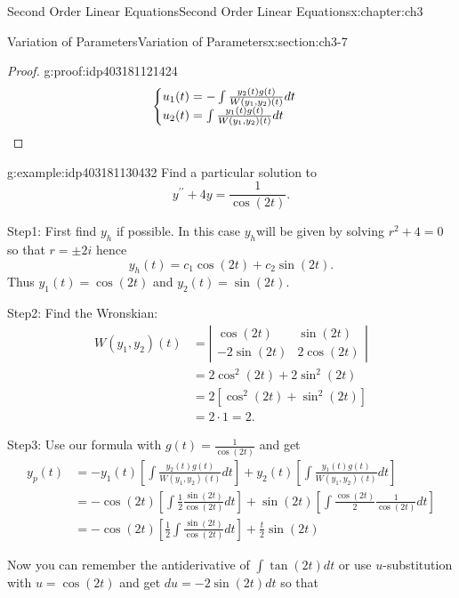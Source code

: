 \documentclass[oneside,10pt,]{book}
\newcommand{\qedhere}{\relax}
\numberwithin{equation}{section}
\numberwithin{equation}{section}
\newcommand{\amp}{&}
\begin{document}
\begin{chapterptx}{Second Order Linear Equations}{}{Second Order Linear Equations}{}{}{x:chapter:ch3}
\begin{sectionptx}{Variation of Parameters}{}{Variation of Parameters}{}{}{x:section:ch3-7}
\begin{proof}{}{g:proof:idp403181121424}
\begin{equation*}
\begin{cases}
u_{1}(t)=-\int\frac{y_{2}(t)g(t)}{W\left(y_{1},y_{2}\right)(t)}dt\\
u_{2}(t)=\int\frac{y_{1}(t)g(t)}{W\left(y_{1},y_{2}\right)(t)}dt
\end{cases}\qedhere
\end{equation*}
%
\end{proof}
\begin{example}{}{g:example:idp403181130432}%
Find a particular solution to%
\begin{equation*}
y^{\prime\prime}+4y=\frac{1}{\cos\left(2t\right)}.
\end{equation*}
%
\par
Step1: First find \(y_{h}\) if possible. In this case \(y_{h}\)will be given by solving \(r^{2}+4=0\) so that \(r=\pm2i\) hence%
\begin{equation*}
y_{h}(t)=c_{1}\cos(2t)+c_{2}\sin\left(2t\right).
\end{equation*}
Thus \(y_{1}(t)=\cos(2t)\) and \(y_{2}(t)=\sin\left(2t\right)\).%
\par
Step2: Find the Wronskian:%
\begin{align*}
W(y_{1},y_{2})(t) \amp =\left|\begin{array}{cc}
\cos(2t) \amp \sin\left(2t\right)\\
-2\sin(2t) \amp 2\cos(2t)
\end{array}\right|\\
\amp =2\cos^{2}(2t)+2\sin^{2}(2t)\\
\amp =2\left[\cos^{2}(2t)+\sin^{2}(2t)\right]\\
\amp =2\cdot1=2.
\end{align*}
%
\par
Step3: Use our formula with \(g(t)=\frac{1}{\cos\left(2t\right)}\) and get%
\begin{align*}
y_{p}(t) \amp =-y_{1}(t)\left[\int\frac{y_{2}(t)g(t)}{W\left(y_{1},y_{2}\right)(t)}dt\right]+y_{2}(t)\left[\int\frac{y_{1}(t)g(t)}{W\left(y_{1},y_{2}\right)(t)}dt\right]\\
\amp =-\cos(2t)\left[\int\frac{1}{2}\frac{\sin(2t)}{\cos\left(2t\right)}dt\right]+\sin(2t)\left[\int\frac{\cos(2t)}{2}\frac{1}{\cos\left(2t\right)}dt\right]\\
\amp =-\cos(2t)\left[\frac{1}{2}\int\frac{\sin(2t)}{\cos\left(2t\right)}dt\right]+\frac{t}{2}\sin(2t)
\end{align*}
%
\par
Now you can remember the antiderivative of \(\int\tan(2t)dt\) or use \(u\)-substitution with \(u=\cos(2t)\) and get \(du=-2\sin(2t)dt\) so that%

\end{example}
\end{sectionptx}
\end{chapterptx}
\end{document}
